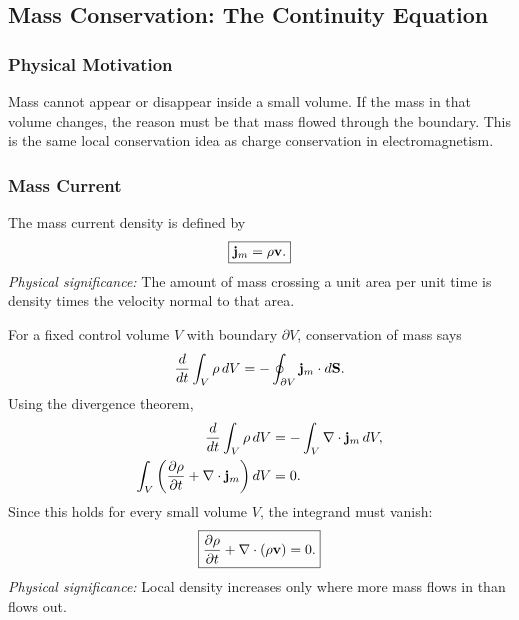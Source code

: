 \documentclass[../main.tex]{subfiles}
\begin{document}
\subsection{Mass Conservation: The Continuity Equation}\label{sec:lec12:continuity}

\subsubsection*{Physical Motivation}
Mass cannot appear or disappear inside a small volume. If the mass in that volume changes, the reason must be that mass flowed through the boundary. This is the same local conservation idea as charge conservation in electromagnetism.

\subsubsection{Mass Current}\label{subsec:lec12:mass-current}
The mass current density is defined by
\begin{equation}
  \boxed{\mathbf{j}_m=\rho\mathbf{v}.}
  \label{eq:lec12_mass_current}
\end{equation}
\textit{Physical significance:} The amount of mass crossing a unit area per unit time is density times the velocity normal to that area.

For a fixed control volume $V$ with boundary $\partial V$, conservation of mass says
\begin{equation}
  \frac{d}{dt}\int_V \rho\,dV
  =
  -\oint_{\partial V}\mathbf{j}_m\cdot d\mathbf{S}.
  \label{eq:lec12_integral_mass_conservation}
\end{equation}
Using the divergence theorem,
\begin{align}
  \frac{d}{dt}\int_V \rho\,dV
  &=
  -\int_V \nabla \cdot \mathbf{j}_m\,dV,
  \label{eq:lec12_continuity_divergence_1}\\
  \int_V \qty(\pdv{\rho}{t}+\nabla \cdot \mathbf{j}_m)\,dV
  &=
  0.
  \label{eq:lec12_continuity_divergence_2}
\end{align}
Since this holds for every small volume $V$, the integrand must vanish:
\begin{equation}
  \boxed{\pdv{\rho}{t}+\nabla \cdot(\rho\mathbf{v})=0.}
  \label{eq:lec12_continuity_equation}
\end{equation}
\textit{Physical significance:} Local density increases only where more mass flows in than flows out.
\end{document}
